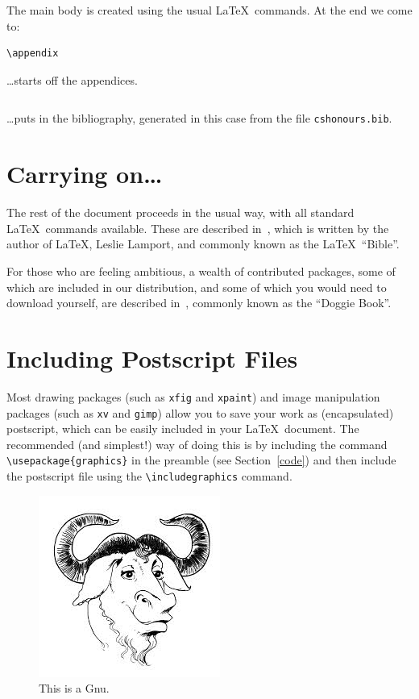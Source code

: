 \documentclass{cshonours}
\begin{document}
The main body is created using the usual \LaTeX\ commands. At the end
we come to:

\begin{verbatim}
\appendix
\end{verbatim}
\ldots starts off the appendices.

\begin{verbatim}

\end{verbatim}
\ldots puts in the bibliography, generated in this case from the
file {\tt cshonours.bib}.


\section{Carrying on\ldots}

The rest of the document proceeds in the usual way, with all standard
\LaTeX\ commands available. These are described in~\cite{bible}, which
is written by the author of \LaTeX, Leslie Lamport, and commonly known
as the \LaTeX\ ``Bible''.

For those who are feeling ambitious, a wealth of contributed
packages, some of which are included in our distribution, and some of
which you would need to download yourself, are described
in~\cite{doggie}, commonly known as the ``Doggie Book''.


\section{Including Postscript Files}

Most drawing packages (such as {\tt xfig} and {\tt xpaint}) and image
manipulation packages (such as {\tt xv} and {\tt gimp}) allow you to
save your work as (encapsulated) postscript, which can be easily
included in your \LaTeX\ document. The recommended (and simplest!) way
of doing this is by including the command \verb!\usepackage{graphics}!
in the preamble (see Section~\ref{code}) and then include the
postscript file using the \verb!\includegraphics! command.

\begin{figure}
\begin{center}
\includegraphics{gnu}
\end{center}
\caption{This is a Gnu.}
\label{gnu}
\end{figure}
\end{document}
